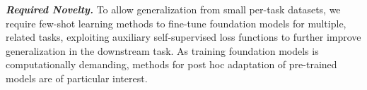 \documentclass{erc-B2}
\begin{document}



\textit{\textbf{Required Novelty.}} 
To allow generalization from small per-task datasets, we require few-shot learning methods to fine-tune foundation models for multiple, related tasks, exploiting auxiliary self-supervised loss functions to further improve generalization in the downstream task. %
As training foundation models is computationally demanding, methods for post hoc adaptation of pre-trained models are of particular interest. 
\end{document}
